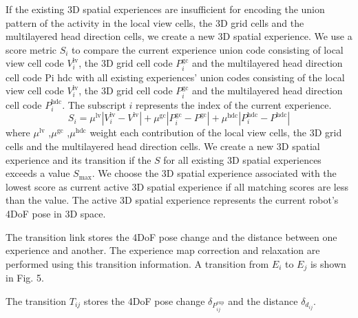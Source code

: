 If the existing 3D spatial experiences are insufficient for encoding the union pattern of the activity in the local view cells, the 3D grid cells and the multilayered head direction cells, we create a new 3D spatial experience. 
We use a score metric $S_i$ to compare the current experience union code consisting of local view cell code $V_i^\text{lv}$, the 3D grid cell code $P_i^{\text{gc}}$ and the multilayered head direction cell code Pi hdc with all existing experiences’ union codes consisting of the local view cell code $V_i^\text{lv}$, the 3D grid cell code $P_i^{\text{gc}}$ and the multilayered head direction cell code $P_i^{\text{hdc}}$. 
The subscript $i$ represents the index of the current experience.
\begin{equation}
	S_i = 
		\mu^{\text{lv}} | V_i^\text{lv} - V^{\text{lv}} | +
		\mu^\text{gc} | P_i^\text{gc} - P^{\text{gc}} | + 
		\mu^\text{hdc} | P_i^\text{hdc} - P^\text{hdc} | 
\end{equation}
%
where $\mu^\text{lv}$ ,$\mu^{\text{gc}}$ ,$\mu^\text{hdc}$ weight each contribution of the local view cells, the 3D grid cells and the multilayered head direction cells. 
We create a new 3D spatial experience and its transition if the $S$ for all existing 3D spatial experiences exceeds a value $S_\text{max}$. 
We choose the 3D spatial experience associated with the lowest score as current active 3D spatial experience if all matching scores are less than the value. 
The active 3D spatial experience represents the current robot's 4DoF pose in 3D space.


The transition link stores the 4DoF pose change and the distance between one experience and another. 
The experience map correction and relaxation are performed using this transition information.
A transition from $E_i$ to $E_j$ is shown in Fig. 5.


The transition $T_{ij}$ stores the 4DoF pose change $\delta_{P_{ij}^{\text{exp}}}$ and the distance $\delta_{d_{ij}}$.

